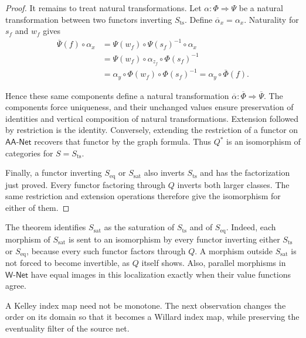 \documentclass[11pt,a4paper]{article}
\theoremstyle{definition}
\theoremstyle{remark}
\newcommand{\Wpar}{\mathsf{W\text{-}Net}}
\newcommand{\NetAA}{\mathsf{AA\text{-}Net}}
\newcommand{\Sts}{S_{\mathrm{ts}}}
\newcommand{\Seq}{S_{\mathrm{eq}}}
\newcommand{\Ssat}{S_{\mathrm{sat}}}
\begin{document}
\begin{proof}
It remains to treat natural transformations. Let
\(\alpha:\Phi\Rightarrow\Psi\) be a natural transformation between
two functors inverting \(\Sts\). Define \(\overline\alpha_x=\alpha_x\).
Naturality for \(s_f\) and \(w_f\) gives
\begin{align*}
 \overline\Psi(f)\circ\alpha_x
 &=\Psi(w_f)\circ\Psi(s_f)^{-1}\circ\alpha_x\\
 &=\Psi(w_f)\circ\alpha_{z_f}\circ\Phi(s_f)^{-1}\\
 &=\alpha_y\circ\Phi(w_f)\circ\Phi(s_f)^{-1}
  =\alpha_y\circ\overline\Phi(f).
\end{align*}

Hence these same components define a natural transformation
\(\overline\alpha:\overline\Phi\Rightarrow\overline\Psi\).
The components force uniqueness, and their unchanged values ensure
preservation of identities and vertical composition of natural
transformations. Extension followed by restriction is the identity.
Conversely, extending the restriction of a functor on \(\NetAA\)
recovers that functor by the graph formula. Thus \(Q^*\) is an
isomorphism of categories for \(S=\Sts\).

Finally, a functor inverting \(\Seq\) or \(\Ssat\) also
inverts \(\Sts\) and has the factorization just proved. Every
functor factoring through \(Q\) inverts both larger classes.
The same restriction and extension operations therefore give the
isomorphism for either of them.
\end{proof}

The theorem identifies \(\Ssat\) as the saturation of \(\Sts\)
and of \(\Seq\). Indeed, each morphism of \(\Ssat\) is sent to
an isomorphism by every functor inverting either \(\Sts\) or
\(\Seq\), because every such functor factors through \(Q\). A morphism outside
\(\Ssat\) is not forced to become invertible, as \(Q\) itself
shows. Also, parallel morphisms in \(\Wpar\) have equal images in
this localization exactly when their value functions agree.


A Kelley index map need not be monotone. The next observation changes
the order on its domain so that it becomes a Willard index map, while
preserving the eventuality filter of the source net.
\end{document}
